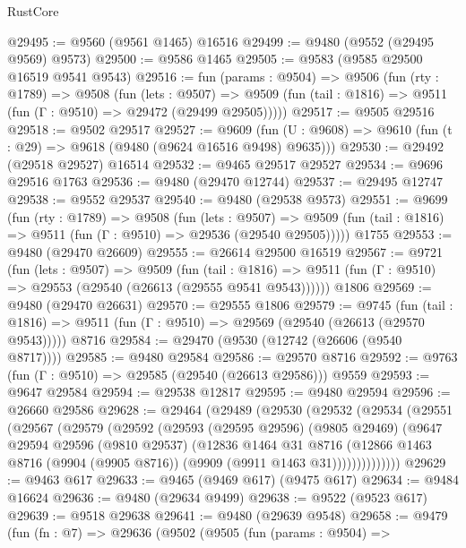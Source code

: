 \begin{lexlean}{RustCore}
\begin{coremodule}
@29495 := @9560 (@9561 @1465) @16516
@29499 := @9480 (@9552 (@29495 @9569) @9573)
@29500 := @9586 @1465
@29505 := @9583 (@9585 @29500 @16519 @9541 @9543)
@29516 := fun (params : @9504) =>
  @9506
    (fun (rty : @1789) =>
    @9508
      (fun (lets : @9507) =>
      @9509 (fun (tail : @1816) => @9511 (fun (Γ : @9510) => @29472 (@29499 @29505)))))
@29517 := @9505 @29516
@29518 := @9502 @29517
@29527 := @9609
    (fun (U : @9608) => @9610 (fun (t : @29) => @9618 (@9480 (@9624 @16516 @9498) @9635)))
@29530 := @29492 (@29518 @29527) @16514
@29532 := @9465 @29517 @29527
@29534 := @9696 @29516 @1763
@29536 := @9480 (@29470 @12744)
@29537 := @29495 @12747
@29538 := @9552 @29537
@29540 := @9480 (@29538 @9573)
@29551 := @9699
    (fun (rty : @1789) =>
    @9508
      (fun (lets : @9507) =>
      @9509 (fun (tail : @1816) => @9511 (fun (Γ : @9510) => @29536 (@29540 @29505)))))
    @1755
@29553 := @9480 (@29470 @26609)
@29555 := @26614 @29500 @16519
@29567 := @9721
    (fun (lets : @9507) =>
    @9509
      (fun (tail : @1816) =>
      @9511 (fun (Γ : @9510) => @29553 (@29540 (@26613 (@29555 @9541 @9543))))))
    @1806
@29569 := @9480 (@29470 @26631)
@29570 := @29555 @1806
@29579 := @9745
    (fun (tail : @1816) => @9511 (fun (Γ : @9510) => @29569 (@29540 (@26613 (@29570 @9543)))))
    @8716
@29584 := @29470 (@9530 (@12742 (@26606 (@9540 @8717))))
@29585 := @9480 @29584
@29586 := @29570 @8716
@29592 := @9763 (fun (Γ : @9510) => @29585 (@29540 (@26613 @29586))) @9559
@29593 := @9647 @29584
@29594 := @29538 @12817
@29595 := @9480 @29594
@29596 := @26660 @29586
@29628 := @29464
    (@29489
      (@29530
        (@29532
          (@29534
            (@29551
              (@29567
                (@29579
                  (@29592
                    (@29593
                      (@29595 @29596)
                      (@9805 @29469)
                      (@9647
                        @29594
                        @29596
                        (@9810 @29537)
                        (@12836
                          @1464
                          @31
                          @8716
                          (@12866
                            @1463
                            @8716
                            (@9904 (@9905 @8716))
                            (@9909 (@9911 @1463 @31))))))))))))))
@29629 := @9463 @617
@29633 := @9465 (@9469 @617) (@9475 @617)
@29634 := @9484 @16624
@29636 := @9480 (@29634 @9499)
@29638 := @9522 (@9523 @617)
@29639 := @9518 @29638
@29641 := @9480 (@29639 @9548)
@29658 := @9479
    (fun (fn : @7) =>
    @29636
      (@9502
        (@9505
          (fun (params : @9504) =>

\end{coremodule}
\end{lexlean}
